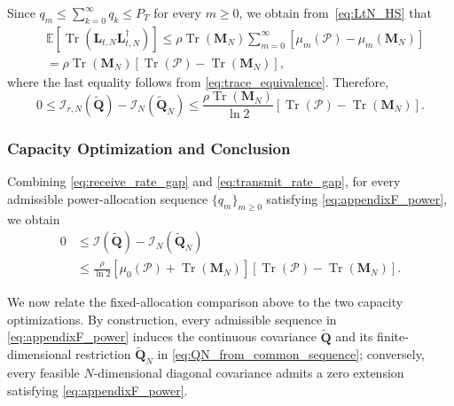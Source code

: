 \documentclass[lettersize,journal]{IEEEtran}
\theoremstyle{plain}
\begin{document}
Since
$q_m\leq\sum_{k=0}^{\infty}q_k\leq P_T$
for every $m\geq0$, we obtain from~\eqref{eq:LtN_HS} that
\begin{align}
	&
	\mathbb E
	\left[
	\operatorname{Tr}
	\left(
	\mathbf L_{t,N}\mathbf L_{t,N}^{\dagger}
	\right)
	\right]
	\leq
	\rho\operatorname{Tr}(\mathbf M_N)
	\sum_{m=0}^{\infty}
	\left[
	\mu_m(\mathcal P)-\mu_m(\mathbf M_N)
	\right]
	\nonumber\\
	&=
	\rho\operatorname{Tr}(\mathbf M_N)
	\left[
	\operatorname{Tr}(\mathcal P)
	-
	\operatorname{Tr}(\mathbf M_N)
	\right], \nonumber
	\label{eq:LtN_trace_bound}
\end{align}
where the last equality follows from
\eqref{eq:trace_equivalence}. Therefore,
\begin{equation}
	0
	\leq
	\mathcal I_{r,N}
	\left(
	\widetilde{\mathbf Q}
	\right)
	-
	\mathcal I_N
	\left(
	\widetilde{\mathbf Q}_N
	\right)
	\leq
	\frac{
		\rho\operatorname{Tr}(\mathbf M_N)
	}{\ln2}
	\left[
	\operatorname{Tr}(\mathcal P)
	-
	\operatorname{Tr}(\mathbf M_N)
	\right].
	\label{eq:transmit_rate_gap}
\end{equation}


\subsubsection{Capacity Optimization and Conclusion}

Combining \eqref{eq:receive_rate_gap} and
\eqref{eq:transmit_rate_gap}, for every admissible
power-allocation sequence $\{q_m\}_{m\geq0}$ satisfying
\eqref{eq:appendixF_power}, we obtain
\begin{align}
	0
	&\leq
	\mathcal I
	\left(
	\widetilde{\mathbf Q}
	\right)
	-
	\mathcal I_N
	\left(
	\widetilde{\mathbf Q}_N
	\right)
	\nonumber\\
	&\leq
	\frac{\rho}{\ln2}
	\left[
	\mu_0(\mathcal P)
	+
	\operatorname{Tr}(\mathbf M_N)
	\right]
	\left[
	\operatorname{Tr}(\mathcal P)
	-
	\operatorname{Tr}(\mathbf M_N)
	\right].
	\label{eq:fixed_Q_capacity_gap}
\end{align}

We now relate the fixed-allocation comparison above to the two
capacity optimizations. By construction, every admissible sequence in \eqref{eq:appendixF_power} induces the continuous covariance \(\widetilde{\mathbf Q}\) and its finite-dimensional restriction \(\widetilde{\mathbf Q}_N\) in \eqref{eq:QN_from_common_sequence}; conversely, every feasible \(N\)-dimensional diagonal covariance admits a zero extension satisfying \eqref{eq:appendixF_power}.
\end{document}
